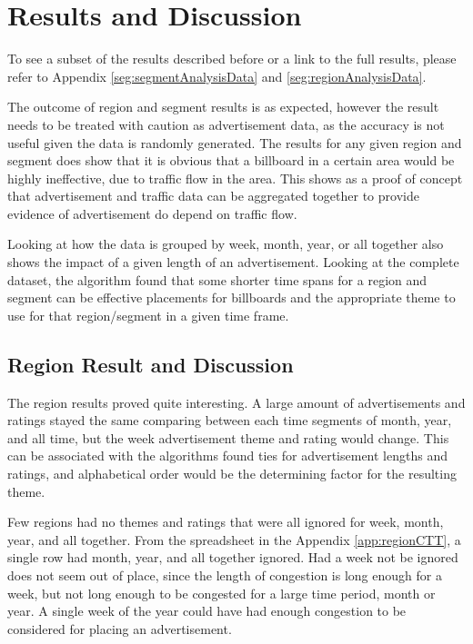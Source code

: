 \documentclass[titlepage,twocolumn]{article}
\begin{document}
\section{Results and Discussion}

\par To see a subset of the results described before or a link to the full results, please refer to Appendix \ref{seg:segmentAnalysisData} and \ref{seg:regionAnalysisData}.


\par The outcome of region and segment results is as expected, however the result needs to be treated with caution as advertisement data, as the accuracy is not useful given the data is randomly generated. The results for any given region and segment does show that it is obvious that a billboard in a certain area would be highly ineffective, due to traffic flow in the area. This shows as a proof of concept that advertisement and traffic data can be aggregated together to provide evidence of advertisement do depend on traffic flow. 

\par Looking at how the data is grouped by week, month, year, or all together also shows the impact of a given length of an advertisement. Looking at the complete dataset, the algorithm found that some shorter time spans for a region and segment can be effective placements for billboards and the appropriate theme to use for that region/segment in a given time frame.  

\subsection{Region Result and Discussion}

\par The region results proved quite interesting. A large amount of advertisements and ratings stayed the same comparing between each time segments of month, year, and all time, but the week advertisement theme and rating would change. This can be associated with the algorithms found ties for advertisement lengths and ratings, and alphabetical order would be the determining factor for the resulting theme. 

\par Few regions had no themes and ratings that were all ignored for week, month, year, and all together. From the spreadsheet in the Appendix \ref{app:regionCTT}, a single row had month, year, and all together ignored. Had a week not be ignored does not seem out of place, since the length of congestion is long enough for a week, but not long enough to be congested for a large time period, month or year. A single week of the year could have had enough congestion to be considered for placing an advertisement. 
\end{document}
